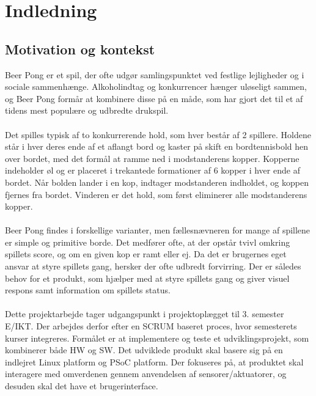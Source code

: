 \documentclass[Rapport/Rapport_main.tex]{subfiles}
\begin{document}
\section{Indledning}\label{sec:Indledning}
\subsection{Motivation og kontekst}
Beer Pong er et spil, der ofte udgør samlingspunktet ved festlige lejligheder og i sociale sammenhænge. Alkoholindtag og konkurrencer hænger uløseligt sammen, og Beer Pong formår at kombinere disse på en måde, som har gjort det til et af tidens mest populære og udbredte drukspil.\cite{drinking_research} \\\\Det spilles typisk af to konkurrerende hold, som hver består af 2 spillere. Holdene står i hver deres ende af et aflangt bord og kaster på skift en bordtennisbold hen over bordet, med det formål at ramme ned i modstanderens kopper. Kopperne indeholder øl og er placeret i trekantede formationer af 6 kopper i hver ende af bordet. Når bolden lander i en kop, indtager modstanderen indholdet, og koppen fjernes fra bordet. Vinderen er det hold, som først eliminerer alle modstanderens kopper.\cite{beerpong_wiki}
\\\\Beer Pong findes i forskellige varianter, men fællesnævneren for mange af spillene er simple og primitive borde. Det medfører ofte, at der opstår tvivl omkring spillets score, og om en given kop er ramt eller ej. Da det er brugernes eget ansvar at styre spillets gang, hersker der ofte udbredt forvirring. Der er således behov for et produkt, som hjælper med at styre spillets gang og giver visuel respons samt information om spillets status.
\\\\Dette projektarbejde tager udgangspunkt i projektoplægget til 3. semester E/IKT\cite{Universitet2018}. Der arbejdes derfor efter en SCRUM baseret proces, hvor semesterets kurser integreres. Formålet er at implementere og teste et udviklingsprojekt, som kombinerer både HW og SW. Det udviklede produkt skal basere sig på en indlejret Linux platform og PSoC platform. Der fokuseres på, at produktet skal interagere med omverdenen gennem anvendelsen af sensorer/aktuatorer, og desuden skal det have et brugerinterface.
\end{document}
